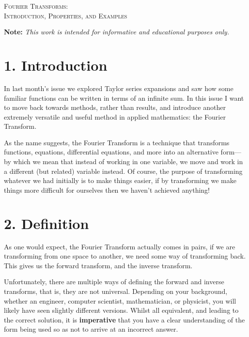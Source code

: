 \documentclass[11pt]{article}
\begin{document}

\begin{tcolorbox}
\begin{center}
    \large
    \textsc{Fourier Transforms: \\ Introduction, Properties, and Examples}
\end{center}
\end{tcolorbox}

\begin{center}
\textbf{Note:} \textit{This work is intended for informative and educational purposes only.}
\end{center}

\section*{1. Introduction}
In last month's issue we explored Taylor series expansions and saw how some familiar functions can be written in terms of an infinite sum. In this issue I want to move back towards methods, rather than results, and introduce another extremely versatile and useful method in applied mathematics: the Fourier Transform. 

As the name suggests, the Fourier Transform is a technique that transforms functions, equations, differential equations, and more into an alternative form––by which we mean that instead of working in one variable, we move and work in a different (but related) variable instead. Of course, the purpose of transforming whatever we had initially is to make things easier, if by transforming we make things more difficult for ourselves then we haven't achieved anything!

\section*{2. Definition}
As one would expect, the Fourier Transform actually comes in pairs, if we are transforming from one space to another, we need some way of transforming back. This gives us the forward transform, and the inverse transform.

Unfortunately, there are multiple ways of defining the forward and inverse transforms, that is, they are not universal. Depending on your background, whether an engineer, computer scientist, mathematician, or physicist, you will likely have seen slightly different versions. Whilst all equivalent, and leading to the correct solution, it is \textbf{imperative} that you have a clear understanding of the form being used so as not to arrive at an incorrect answer. 
\end{document}
